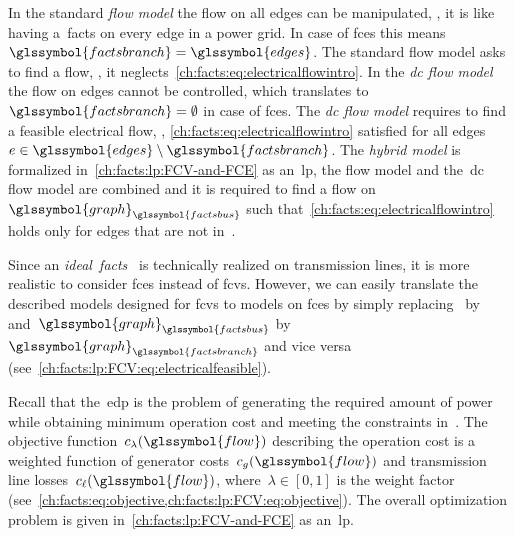 In the standard \emph{flow model} the flow on all edges can be manipulated, \ie,
it is like having a~\gls{facts} on every edge in a power grid. In case of
\gls{fce}s this means~$\glssymbol{factsbranch} = \glssymbol{edges}$. The
standard flow model asks to find a flow, \ie, it
neglects~\cref{ch:facts:eq:electricalflowintro}. In the \emph{\gls{dc} flow
model}~\parencite{Zimmerman2011a} the flow on edges cannot be controlled, which
translates to~$\glssymbol{factsbranch} = \emptyset$ in case of \gls{fce}s. The
\emph{\gls{dc} flow model} requires to find a feasible electrical flow, \ie,
\cref{ch:facts:eq:electricalflowintro} satisfied for all
edges~$\edge\in\glssymbol{edges}\setminus\glssymbol{factsbranch}$. The
\emph{hybrid model} is formalized in~\cref{ch:facts:lp:FCV-and-FCE} as
an~\gls{lp}, the flow model and the~\gls{dc} flow model are combined and it is
required to find a flow on~$\glssymbol{graph}_{\glssymbol{factsbus}}$ such
that~\cref{ch:facts:eq:electricalflowintro} holds only for edges that are not
in~.

Since an \emph{ideal~\gls{facts}}~\parencite{julieGriffin} is technically
realized on transmission lines, it is more realistic to consider \gls{fce}s
instead of \gls{fcv}s. However, we can easily translate the described models
designed for \gls{fcv}s to models on \gls{fce}s by simply
replacing~ by~
and~$\glssymbol{graph}_{\glssymbol{factsbus}}$
by~$\glssymbol{graph}_{\glssymbol{factsbranch}}$ and vice versa
(see~\cref{ch:facts:lp:FCV:eq:electricalfeasible}).

Recall that the~\gls{edp} is the problem of generating the required amount of
power while obtaining minimum operation cost and meeting the constraints
in~. The objective
function~$\totalgenlosscost(\glssymbol{flow})$ describing the operation cost is
a weighted function of generator costs~$\gencost(\glssymbol{flow})$ and
transmission line losses~$\losscost(\glssymbol{flow})$, where~$\lambda\in[0,1]$
is the weight factor
(see~\cref{ch:facts:eq:objective,ch:facts:lp:FCV:eq:objective}). The overall
optimization problem is given in~\cref{ch:facts:lp:FCV-and-FCE} as an~\gls{lp}.
% 
